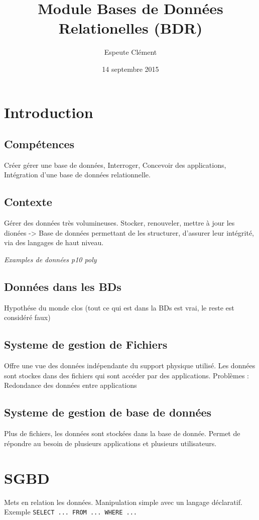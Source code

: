 \documentclass[11pt]{article}
\title{Module Bases de Données Relationelles (BDR)}
\author{{\sc Espeute} Clément}
\date{14 septembre 2015}
\begin{document}
\pagestyle{fancy}
\maketitle
\newpage
\section{Introduction}
\subsection{Compétences}
Créer gérer une base de données, Interroger, Concevoir des applications, Intégration d'une base de données relationnelle.
\subsection{Contexte}
Gérer des données très volumineuses. Stocker, renouveler, mettre à jour les dionées -> Base de données permettant de les structurer, d'assurer leur intégrité, via des langages de haut niveau.

\emph{Examples de données p10 poly}

\subsection{Données dans les BDs}
Hypothése du monde clos (tout ce qui est dans la BDs est vrai, le reste est considéré faux)

\subsection{Systeme de gestion de Fichiers}
Offre une vue des données indépendante du support physique utilisé. Les données sont stockes dans des fichiers qui sont accéder par des applications. Problèmes : Redondance des données entre applications

\subsection{Systeme de gestion de base de données}
Plus de fichiers, les données sont stockées dans la base de donnée. Permet de répondre au besoin de plusieurs applications et plusieurs utilisateurs.

\section{SGBD}
Mets en relation les données. Manipulation simple avec un langage déclaratif.
Exemple {\tt SELECT ... FROM ... WHERE ...}
\end{document}
